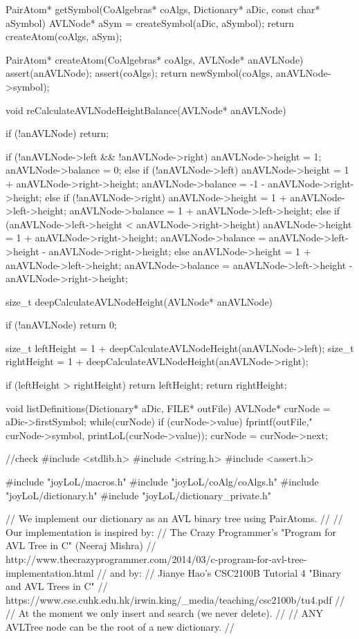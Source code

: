 PairAtom* getSymbol(CoAlgebras* coAlgs,
                    Dictionary* aDic,
                    const char* aSymbol) {
  AVLNode* aSym = createSymbol(aDic, aSymbol);
  return createAtom(coAlgs, aSym);
}

PairAtom* createAtom(CoAlgebras* coAlgs, AVLNode* anAVLNode) {
  assert(anAVLNode);
  assert(coAlgs);
  return newSymbol(coAlgs, anAVLNode->symbol);
}

void reCalculateAVLNodeHeightBalance(AVLNode* anAVLNode) {
  if (!anAVLNode) return;

  if (!anAVLNode->left && !anAVLNode->right) {
    anAVLNode->height  = 1;
    anAVLNode->balance = 0;
  } else if (!anAVLNode->left) {
    anAVLNode->height  =  1 + anAVLNode->right->height;
    anAVLNode->balance = -1 - anAVLNode->right->height;
  } else if (!anAVLNode->right) {
    anAVLNode->height  = 1 + anAVLNode->left->height;
    anAVLNode->balance = 1 + anAVLNode->left->height;
  } else if (anAVLNode->left->height < anAVLNode->right->height) {
    anAVLNode->height  = 1 + anAVLNode->right->height;
    anAVLNode->balance = anAVLNode->left->height - anAVLNode->right->height;
  } else {
    anAVLNode->height  = 1 + anAVLNode->left->height;
    anAVLNode->balance = anAVLNode->left->height - anAVLNode->right->height;
  }
}

size_t deepCalculateAVLNodeHeight(AVLNode* anAVLNode) {
  if (!anAVLNode) return 0;

  size_t leftHeight = 1 + deepCalculateAVLNodeHeight(anAVLNode->left);
  size_t rightHeight = 1 + deepCalculateAVLNodeHeight(anAVLNode->right);

  if (leftHeight > rightHeight) return leftHeight;
  return rightHeight;
}

void listDefinitions(Dictionary* aDic, FILE* outFile) {
  AVLNode* curNode = aDic->firstSymbol;
  while(curNode) {
    if (curNode->value) {
      fprintf(outFile,"%
              curNode->symbol, printLoL(curNode->value));
    }
    curNode = curNode->next;
  }
}

\stoptyping

\starttyping
//check
#include <stdlib.h>
#include <string.h>
#include <assert.h>

#include "joyLoL/macros.h"
#include "joyLoL/coAlg/coAlgs.h"
#include "joyLoL/dictionary.h"
#include "joyLoL/dictionary_private.h"

// We implement our dictionary as an AVL binary tree using PairAtoms.
//
// Our implementation is inspired by:
// The Crazy Programmer's "Program for AVL Tree in C" (Neeraj Mishra)
// http://www.thecrazyprogrammer.com/2014/03/c-program-for-avl-tree-implementation.html
// and by:
// Jianye Hao's CSC2100B Tutorial 4 "Binary and AVL Trees in C"
// https://www.cse.cuhk.edu.hk/irwin.king/_media/teaching/csc2100b/tu4.pdf
//
// At the moment we only insert and search (we never delete).
//
// ANY AVLTree node can be the root of a new dictionary.
//

